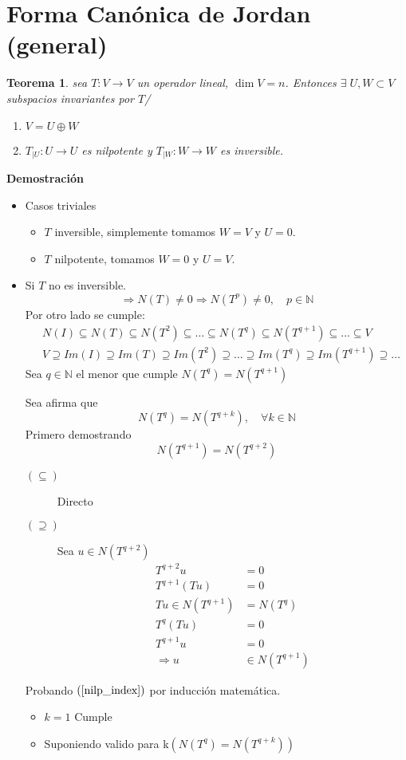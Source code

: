 \documentclass[10pt,a4paper]{article}
\newtheorem{mytheo}{Teorema}
\begin{document}
\section{Forma Canónica de Jordan (general)}
\begin{mytheo}
	sea $T:V\rightarrow V$ un operador lineal, $\dim V = n$. Entonces $\exists\;U, W\subset V$ subspacios invariantes por $T$/
	\begin{enumerate}
		\item $V = U\oplus W$
		\item $T_{|U}:U\rightarrow U$ es nilpotente y $T_{|W}:W\rightarrow W$ es inversible.
	\end{enumerate}
\end{mytheo}
\textbf{Demostración}\\
\begin{itemize}
	\item Casos triviales
			\begin{itemize}
				\item $T$ inversible, simplemente tomamos $W = V$ y $U=0$.
				\item $T$ nilpotente, tomamos $W = 0$ y $U = V$.
			\end{itemize}
	\item Si $T$ no es inversible.
		$$\Rightarrow N(T) \neq 0 \Rightarrow N(T^{p}) \neq 0,\quad p\in\mathbb{N}$$
		Por otro lado se cumple:
		\begin{align*}
		& N(I)\subseteq N(T)\subseteq N(T^{2})\subseteq \ldots\subseteq N(T^{q})\subseteq N(T^{q+1}) \subseteq\ldots\subseteq V\\
		& V \supseteq Im(I)\supseteq Im(T)\supseteq Im(T^{2})\supseteq\ldots\supseteq Im(T^{q})\supseteq Im(T^{q+1})\supseteq\ldots
		\end{align*}
		Sea $q\in\mathbb{N}$ el menor que cumple $N(T^{q}) = N(T^{q+1})$
		
		Sea afirma que 
		\begin{equation}\label{nilp_index}
		N(T^{q}) =  N(T^{q+k}),\quad\forall k\in\mathbb{N}
		\end{equation}
		Primero demostrando
		$$N(T^{q+1}) = N(T^{q+2})$$
		\begin{description}
			\item[$(\subseteq)$] Directo
			\item[$(\supseteq)$] Sea $u\in N(T^{q+2})$
			\begin{align*}
				T^{q+2}u &= 0\\
				T^{q+1}(Tu) &= 0\\
				Tu\in N(T^{q+1}) &= N(T^{q})\\
				T^{q}(Tu) &= 0\\
				T^{q+1}u &= 0\\
				\Rightarrow u &\in N(T^{q+1})
			\end{align*}
		\end{description}
		Probando $(\ref{nilp_index})$ por inducción matemática.
		\begin{itemize}
			\item $k = 1$ Cumple
			\item Suponiendo valido para k$\left(N\left(T^{q}\right) = N\left(T^{q+k}\right) \right)$
			

\end{itemize}
\end{itemize}
\end{document}
